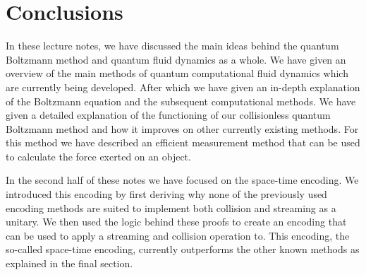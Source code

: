 \section{Conclusions}
In these lecture notes, we have discussed the main ideas behind the quantum Boltzmann method and quantum fluid dynamics as a whole. We have given an overview of the main methods of quantum computational fluid dynamics which are currently being developed. After which we have given an in-depth explanation of the Boltzmann equation and the subsequent computational methods. We have given a detailed explanation of the functioning of our collisionless quantum Boltzmann method and how it improves on other currently existing methods. For this method we have described an efficient measurement method that can be used to calculate the force exerted on an object. 

In the second half of these notes we have focused on the space-time encoding. We introduced this encoding by first deriving why none of the previously used encoding methods are suited to implement both collision and streaming as a unitary. We then used the logic behind these proofs to create an encoding that can be used to apply a streaming and collision operation to. This encoding, the so-called space-time encoding, currently outperforms the other known methods as explained in the final section. 
